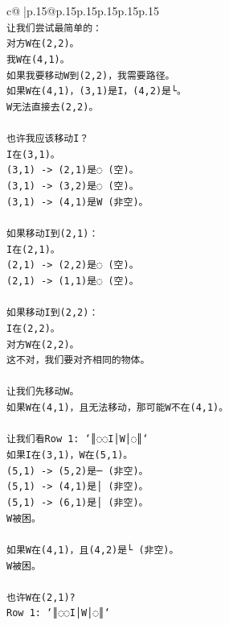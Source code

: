 \documentclass{article}
\begin{document}
{\begin{supertabular}{c@{$\;$}|p{.15\linewidth}@{}p{.15\linewidth}p{.15\linewidth}p{.15\linewidth}p{.15\linewidth}p{.15\linewidth}}
{{{\\ 
\texttt{让我们尝试最简单的：} \\
\texttt{对方W在(2,2)。} \\
\texttt{我W在(4,1)。} \\
\texttt{如果我要移动W到(2,2)，我需要路径。} \\
\texttt{如果W在(4,1)，(3,1)是I，(4,2)是└。} \\
\texttt{W无法直接去(2,2)。} \\
\\ 
\texttt{也许我应该移动I？} \\
\texttt{I在(3,1)。} \\
\texttt{(3,1) {-}> (2,1)是◌ (空)。} \\
\texttt{(3,1) {-}> (3,2)是◌ (空)。} \\
\texttt{(3,1) {-}> (4,1)是W (非空)。} \\
\\ 
\texttt{如果移动I到(2,1)：} \\
\texttt{I在(2,1)。} \\
\texttt{(2,1) {-}> (2,2)是◌ (空)。} \\
\texttt{(2,1) {-}> (1,1)是◌ (空)。} \\
\\ 
\texttt{如果移动I到(2,2)：} \\
\texttt{I在(2,2)。} \\
\texttt{对方W在(2,2)。} \\
\texttt{这不对，我们要对齐相同的物体。} \\
\\ 
\texttt{让我们先移动W。} \\
\texttt{如果W在(4,1)，且无法移动，那可能W不在(4,1)。} \\
\\ 
\texttt{让我们看Row 1: `║◌◌I│W│◌║`} \\
\texttt{如果I在(3,1)，W在(5,1)。} \\
\texttt{(5,1) {-}> (5,2)是─ (非空)。} \\
\texttt{(5,1) {-}> (4,1)是│ (非空)。} \\
\texttt{(5,1) {-}> (6,1)是│ (非空)。} \\
\texttt{W被困。} \\
\\ 
\texttt{如果W在(4,1)，且(4,2)是└ (非空)。} \\
\texttt{W被困。} \\
\\ 
\texttt{也许W在(2,1)?} \\
\texttt{Row 1: `║◌◌I│W│◌║`} \\
}}}
\end{supertabular}}
\end{document}
